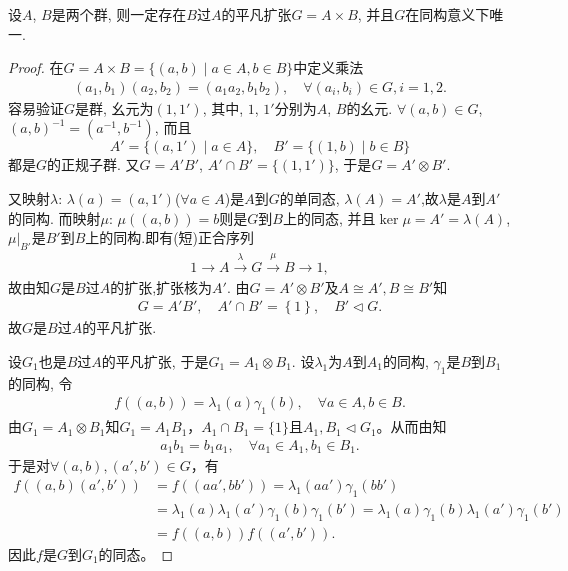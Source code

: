 \documentclass[../../main.tex]{subfiles}%
\begin{document}
\begin{theorem}\label{theorem:抽象代数--定理4.5.4}
设$A$, $B$是两个群, 则一定存在$B$过$A$的平凡扩张$G=A\times B$, 并且$G$在同构意义下唯一.
\end{theorem}
\begin{proof}

在$G = A\times B = \{(a, b)\mid a\in A, b\in B\}$中定义乘法
\begin{align*}
(a_1, b_1)(a_2, b_2) = (a_1a_2, b_1b_2),\quad \forall (a_i, b_i)\in G, i = 1, 2.
\end{align*}
容易验证$G$是群, 幺元为$(1, 1')$, 其中, $1$, $1'$分别为$A$, $B$的幺元. $\forall (a, b)\in G$, $(a, b)^{-1} = (a^{-1}, b^{-1})$, 而且
$$
A' = \{(a, 1')\mid a\in A\},\quad B' = \{(1, b)\mid b\in B\}
$$
都是$G$的正规子群. 又$G = A'B'$, $A'\cap B' = \{(1, 1')\}$, 于是$G = A'\otimes B'$. 

又映射$\lambda$: $\lambda(a) = (a, 1')$($\forall a\in A$)是$A$到$G$的单同态, $\lambda(A) = A'$,故$\lambda$是$A$到$A'$的同构. 而映射$\mu$: $\mu((a, b)) = b$则是$G$到$B$上的同态, 并且$\ker\mu = A'=\lambda(A)$, $\mu|_{B'}$是$B'$到$B$上的同构.即有(短)正合序列
\begin{align*}
1\longrightarrow A \stackrel{\lambda}{\longrightarrow} G \stackrel{\mu}{\longrightarrow} B\longrightarrow 1,
\end{align*}
故由知$G$是$B$过$A$的扩张,扩张核为$A'$.
由$G = A'\otimes B'$及$A\cong A' ,B\cong B'$知
\begin{align*}
G=A'B',\quad A' \cap B' =\left\{ 1 \right\},\quad B'\lhd G.
\end{align*}
故$G$是$B$过$A$的平凡扩张.

设$G_1$也是$B$过$A$的平凡扩张, 于是$G_1 = A_1\otimes B_1$. 设$\lambda_1$为$A$到$A_1$的同构, $\gamma_1$是$B$到$B_1$的同构, 令
\begin{align*}
f((a, b)) = \lambda_1(a)\gamma_1(b),\quad \forall a\in A, b\in B.
\end{align*}
由$G_1=A_1\otimes B_1$知$G_1=A_1B_1$，$A_1\cap B_1=\{1\}$且$A_1,B_1\lhd G_1$。从而由知
\begin{align*}
a_1b_1=b_1a_1,\quad \forall a_1\in A_1,b_1\in B_1.
\end{align*}
于是对$\forall (a,b),(a',b')\in G$，有
\begin{align*}
f((a,b)(a',b'))&=f((aa',bb'))=\lambda_1(aa')\gamma_1(bb') \\
&=\lambda_1(a)\lambda_1(a')\gamma_1(b)\gamma_1(b')=\lambda_1(a)\gamma_1(b)\lambda_1(a')\gamma_1(b') \\
&=f((a,b))f((a',b')).
\end{align*}
因此$f$是$G$到$G_1$的同态。


\end{proof}
\end{document}
